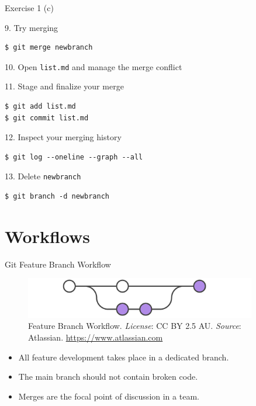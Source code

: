 \documentclass[handout]{beamer}
\begin{document}
\begin{frame}[fragile]{Exercise 1 (c)}



\vspace{0.3cm}

9. Try merging

\begin{lstlisting}
$ git merge newbranch
\end{lstlisting}

10. Open \texttt{list.md} and manage the merge conflict

\vspace{0.3cm}

11. Stage and finalize your merge

\begin{lstlisting}
$ git add list.md
$ git commit list.md
\end{lstlisting}

12. Inspect your merging history

\begin{lstlisting}
$ git log --oneline --graph --all
\end{lstlisting}

13. Delete \texttt{newbranch}

\begin{lstlisting}
$ git branch -d newbranch
\end{lstlisting}

\end{frame}

\section{Workflows}

\begin{frame}{Git Feature Branch Workflow}
\begin{figure}
	\includegraphics[width=0.9\textwidth]{figures/feature_branch.pdf}
	\caption{Feature Branch Workflow. \textit{License}: CC BY 2.5 AU. \textit{Source}: Atlassian. \href{https://www.atlassian.com/git/tutorials/comparing-workflows/feature-branch-workflow}{https://www.atlassian.com}}
\end{figure}
\begin{itemize}
	\item All feature development takes place in a dedicated branch.
	\item The main branch should not contain broken code.
	\item Merges are the focal point of discussion in a team.
\end{itemize}
\end{frame}
\end{document}
